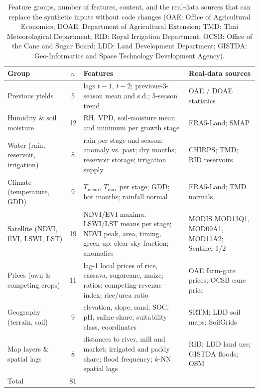 \begin{table}[t]\centering\scriptsize
\caption{Feature groups, number of features, content, and the real-data sources that can replace the synthetic inputs without code changes (OAE: Office of Agricultural Economics; DOAE: Department of Agricultural Extension; TMD: Thai Meteorological Department; RID: Royal Irrigation Department; OCSB: Office of the Cane and Sugar Board; LDD: Land Development Department; GISTDA: Geo-Informatics and Space Technology Development Agency).}\label{tab:features}
\begin{tabularx}{\textwidth}{@{}p{3.3cm}cXp{3.4cm}@{}}
\toprule
Group & $n$ & Features & Real-data sources \\
\midrule
Previous yields & 5 & lags $t-1$, $t-2$; previous-3-season mean and s.d.; 5-season trend & OAE / DOAE statistics \\
Humidity \& soil moisture & 12 & RH, VPD, soil-moisture mean and minimum per growth stage & ERA5-Land; SMAP \\
Water (rain, reservoir, irrigation) & 8 & rain per stage and season; anomaly vs. past; dry months; reservoir storage; irrigation supply & CHIRPS; TMD; RID reservoirs \\
Climate (temperature, GDD) & 9 & $T_{\mathrm{mean}}$, $T_{\max}$ per stage; GDD; hot months; rainfall normal & ERA5-Land; TMD normals \\
Satellite (NDVI, EVI, LSWI, LST) & 19 & NDVI/EVI maxima, LSWI/LST means per stage; NDVI peak, area, timing, green-up; clear-sky fraction; anomalies & MODIS MOD13Q1, MOD09A1, MOD11A2; Sentinel-1/2 \\
Prices (own \& competing crops) & 11 & lag-1 local prices of rice, cassava, sugarcane, maize; ratios; competing-revenue index; rice/urea ratio & OAE farm-gate prices; OCSB cane price \\
Geography (terrain, soil) & 9 & elevation, slope, sand, SOC, pH, saline share, suitability class, coordinates & SRTM; LDD soil maps; SoilGrids \\
Map layers \& spatial lags & 8 & distances to river, mill and market; irrigated and paddy share; flood frequency; $k$-NN spatial lags & RID; LDD land use; GISTDA floods; OSM \\
\midrule Total & 81 & & \\
\bottomrule
\end{tabularx}
\end{table}
